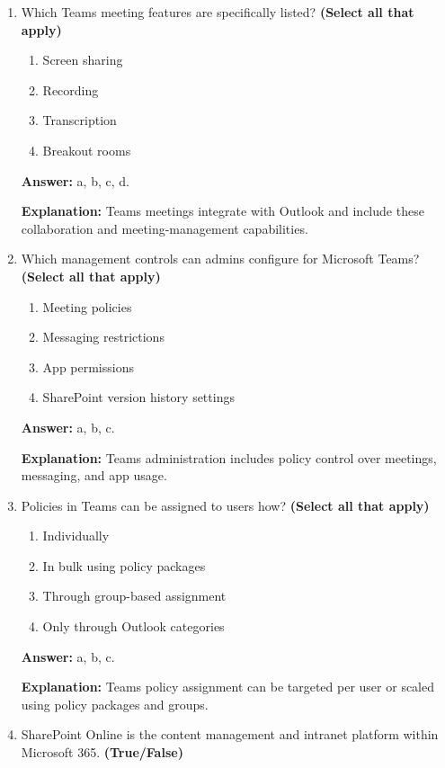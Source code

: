 \documentclass[10pt]{article}
\begin{document}
\begin{enumerate}[leftmargin=*]
\textbf{Explanation:} Channels organize conversations, files, and app tabs by topic or project.

\item Which Teams meeting features are specifically listed? \textbf{(Select all that apply)}
\begin{enumerate}[label=\alph*., leftmargin=1.5em]
\item Screen sharing
\item Recording
\item Transcription
\item Breakout rooms
\end{enumerate}
\textbf{Answer:} a, b, c, d.

\textbf{Explanation:} Teams meetings integrate with Outlook and include these collaboration and meeting-management capabilities.

\item Which management controls can admins configure for Microsoft Teams? \textbf{(Select all that apply)}
\begin{enumerate}[label=\alph*., leftmargin=1.5em]
\item Meeting policies
\item Messaging restrictions
\item App permissions
\item SharePoint version history settings
\end{enumerate}
\textbf{Answer:} a, b, c.

\textbf{Explanation:} Teams administration includes policy control over meetings, messaging, and app usage.

\item Policies in Teams can be assigned to users how? \textbf{(Select all that apply)}
\begin{enumerate}[label=\alph*., leftmargin=1.5em]
\item Individually
\item In bulk using policy packages
\item Through group-based assignment
\item Only through Outlook categories
\end{enumerate}
\textbf{Answer:} a, b, c.

\textbf{Explanation:} Teams policy assignment can be targeted per user or scaled using policy packages and groups.

\item SharePoint Online is the content management and intranet platform within Microsoft 365. \textbf{(True/False)}


\end{enumerate}
\end{document}

